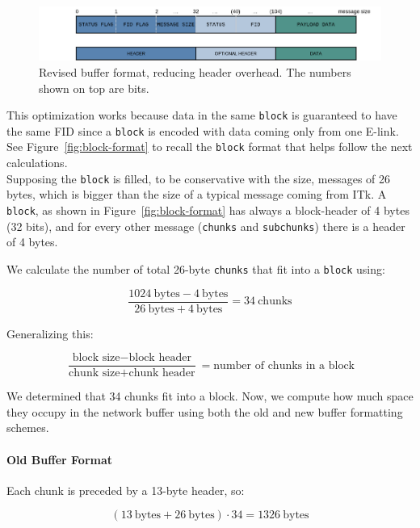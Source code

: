 \begin{figure}[htbp]
\centering
\includegraphics[width=\textwidth]{images/contributions/new-buffer-format.png}
\caption[New network buffer format]{Revised buffer format, reducing header overhead. The numbers shown on top are bits.}
\label{fig:new-buffer-format}
\end{figure}

This optimization works because data in the same \texttt{block} is guaranteed to have the same \acs{FID} since a \texttt{block} is encoded with data coming only from one \acs{E-link}.\\
See Figure~\ref{fig:block-format} to recall the \texttt{block} format that helps follow the next calculations.\\
Supposing the \texttt{block} is filled, to be conservative with the size, messages of 26 bytes, which is bigger than the size of a typical message coming from \acs{ITk}. A \texttt{block}, as shown in Figure~\ref{fig:block-format} has always a block-header of 4 bytes (32 bits), and for every other message (\texttt{chunks} and \texttt{subchunks}) there is a header of 4 bytes.

We calculate the number of total 26-byte \texttt{chunks} that fit into a \texttt{block} using:

\[
\frac{1024~\text{bytes} - 4~\text{bytes}}{26~\text{bytes} + 4~\text{bytes}} = 34~\text{chunks}
\]

Generalizing this:

\[
\frac{\text{block size} - \text{block header}}{\text{chunk size} + \text{chunk header}} = \text{number of chunks in a block}
\]

We determined that 34 chunks fit into a block. Now, we compute how much space they occupy in the network buffer using both the old and new buffer formatting schemes.

\paragraph{Old Buffer Format}

Each chunk is preceded by a 13-byte header, so:

\[
(13~\text{bytes} + 26~\text{bytes}) \cdot 34 = 1326~\text{bytes}
\]

